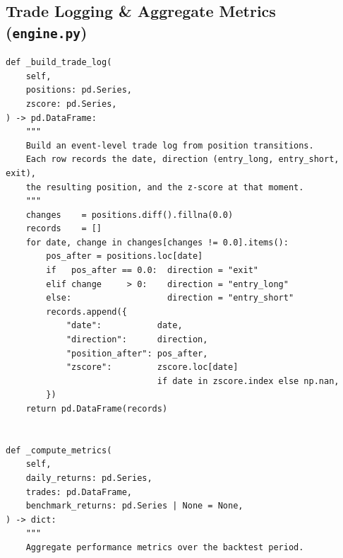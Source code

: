 \documentclass[a4paper]{report}
\begin{document}
\subsection{Trade Logging \& Aggregate Metrics (\texttt{engine.py})}

\begin{Verbatim}[fontsize=\footnotesize, baselinestretch=0.85]
def _build_trade_log(
    self,
    positions: pd.Series,
    zscore: pd.Series,
) -> pd.DataFrame:
    """
    Build an event-level trade log from position transitions.
    Each row records the date, direction (entry_long, entry_short, exit),
    the resulting position, and the z-score at that moment.
    """
    changes    = positions.diff().fillna(0.0)
    records    = []
    for date, change in changes[changes != 0.0].items():
        pos_after = positions.loc[date]
        if   pos_after == 0.0:  direction = "exit"
        elif change     > 0:    direction = "entry_long"
        else:                   direction = "entry_short"
        records.append({
            "date":           date,
            "direction":      direction,
            "position_after": pos_after,
            "zscore":         zscore.loc[date]
                              if date in zscore.index else np.nan,
        })
    return pd.DataFrame(records)


def _compute_metrics(
    self,
    daily_returns: pd.Series,
    trades: pd.DataFrame,
    benchmark_returns: pd.Series | None = None,
) -> dict:
    """
    Aggregate performance metrics over the backtest period.


\end{Verbatim}
\end{document}
